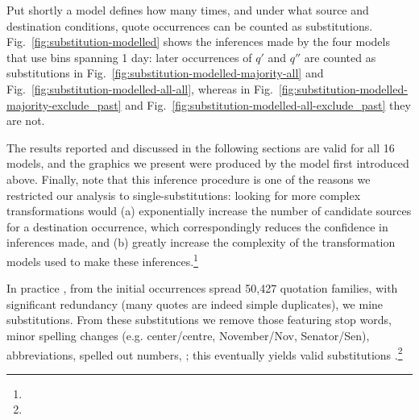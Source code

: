 \begin{new}

Put shortly a model defines how many times, and under what source and destination conditions, quote occurrences can be counted as substitutions.
Fig.~\ref{fig:substitution-modelled} shows the inferences made by the four models that use  %
bins spanning 1 day:
later occurrences of $q'$ and $q''$ are counted as substitutions in Fig.~\ref{fig:substitution-modelled-majority-all} and Fig.~\ref{fig:substitution-modelled-all-all}, whereas in Fig.~\ref{fig:substitution-modelled-majority-exclude_past} and Fig.~\ref{fig:substitution-modelled-all-exclude_past} they are not.

The results reported and discussed in the following sections are valid for all 16 models, and the graphics we present were produced by the model first introduced above.
Finally, note that this inference procedure is one of the reasons we restricted our analysis to single-substitutions:
looking for more complex transformations would
(a) exponentially increase the number of candidate sources for a destination occurrence, which correspondingly reduces the confidence in inferences made,
and (b) greatly increase the complexity of the transformation models used to make these inferences.\footnote{
}

\end{new}

\medskip

In practice , from the  initial occurrences spread  50,427 quotation families, with significant redundancy (many quotes are indeed simple duplicates), we mine  substitutions.
From these substitutions we remove those featuring stop words, minor spelling changes (\hbox{e.g.} center/centre, November/Nov, Senator/Sen), abbreviations, spelled out numbers, ;
this eventually yields  valid substitutions .\footnote{
}

